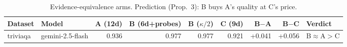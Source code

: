 \begin{table}[t]
\centering
\small
\begin{tabular}{llrrrrrrl}
\toprule
Dataset & Model & A (12d) & B (6d+probes) & B ($\kappa/2$) & C (9d) & B$-$A & B$-$C & Verdict \\
\midrule
triviaqa & gemini-2.5-flash & 0.936 & 0.977 & 0.977 & 0.921 & +0.041 & +0.056 & B$\approx$A$>$C \\
\bottomrule
\end{tabular}
\caption{Evidence-equivalence arms. Prediction (Prop.~3): B buys A's quality at C's price.}
\label{tab:arms}
\end{table}
